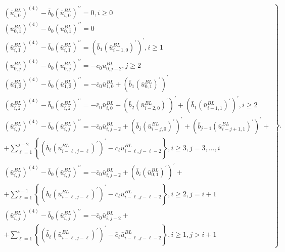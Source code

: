 \documentclass[10pt,a4paper]{amsart}
\begin{document}
\begin{equation}
\left. 
\begin{array}{c}
\left(\bar{u}^{BL}_{i,0}\right)^{(4)}-\bar{b}_{0}\left(\bar{u}^{BL}_{i,0}\right)^{\prime \prime }=0,i\geq 0 \\
\left(\bar{u}^{BL}_{0,1}\right)^{(4)}-\bar{b}_{0}\left(\bar{u}^{BL}_{0,1}\right)^{\prime \prime }=0 \\
\left(\bar{u}^{BL}_{i,1}\right)^{(4)}-\bar{b}_{0}\left(\bar{u}^{BL}_{i,1}\right)^{\prime \prime }=\left( \bar{b}_{1}\left(\bar{u}^{BL}_{i-1,0}\right)^{\prime }\right) ^{\prime },i\geq 1 \\
\left(\bar{u}^{BL}_{0,j}\right)^{(4)}-\bar{b}_{0}\left(\bar{u}^{BL}_{0,j}\right)^{\prime \prime }=-\bar{c}_{0}\bar{u}^{BL}_{0,j-2},j\geq 2 \\
\left(\bar{u}^{BL}_{1,2}\right)^{(4)}-\bar{b}_{0}\left(\bar{u}^{BL}_{1,2}\right)^{\prime \prime }=-\bar{c}_{0}\bar{u}^{BL}_{1,0}+\left( \bar{b}_{1}\left(\bar{u}^{BL}_{0,1}\right)^{\prime }\right) ^{\prime } \\
\left(\bar{u}^{BL}_{i,2}\right)^{(4)}-\bar{b}_{0}\left(\bar{u}^{BL}_{i,2}\right)^{\prime \prime }=-\bar{c}_{0}\bar{u}^{BL}_{i,0}+\left( \bar{b}_{2}\left(\bar{u}^{BL}_{i-2,0}\right)^{\prime }\right) ^{\prime }+\left( \bar{b}_{1}\left(\bar{u}^{BL}_{i-1,1}\right)^{\prime }\right) ^{\prime },i\geq 2 \\
\left(\bar{u}^{BL}_{i,j}\right)^{(4)}-\bar{b}_{0}\left(\bar{u}^{BL}_{i,j}\right)^{\prime \prime }=-\bar{c}_{0}\bar{u}^{BL}_{i,j-2}+\left( \bar{b}_{j}\left(\bar{u}^{BL}_{i-j,0}\right)^{\prime }\right) ^{\prime }+\left( \bar{b}_{j-1}\left(\bar{u}^{BL}_{i-j+1,1}\right)^{\prime }\right) ^{\prime }+ \\
+\sum_{\ell =1}^{j-2}\left\{ \left( \bar{b}_{\ell}\left(\bar{u}^{BL}_{i-\ell ,j-\ell}\right)^{\prime }\right) ^{\prime }-\bar{c}_{\ell}\bar{u}^{BL}_{i-\ell ,j-\ell -2}\right\} ,i\geq 3,j=3,\ldots ,i \\
\left(\bar{u}^{BL}_{i,j}\right)^{(4)}-\bar{b}_{0}\left(\bar{u}^{BL}_{i,j}\right)^{\prime \prime }=-\bar{c}_{0}\bar{u}^{BL}_{i,j-2}+\left( \bar{b}_{i}\left(\bar{u}^{BL}_{0,1}\right)^{\prime }\right) ^{\prime }+ \\
+\sum_{\ell =1}^{i-1}\left\{ \left( \bar{b}_{\ell}\left(\bar{u}^{BL}_{i-\ell ,j-\ell}\right)^{\prime }\right) ^{\prime }-\bar{c}_{\ell}\bar{u}^{BL}_{i-\ell ,j-\ell -2}\right\} ,i\geq 2,j=i+1 \\
\left(\bar{u}^{BL}_{i,j}\right)^{(4)}-\bar{b}_{0}\left(\bar{u}^{BL}_{i,j}\right)^{\prime \prime }=-\bar{c}_{0}\bar{u}^{BL}_{i,j-2}+ \\
+\sum_{\ell =1}^{i}\left\{ \left( \bar{b}_{\ell}\left(\bar{u}^{BL}_{i-\ell ,j-\ell}\right)^{\prime }\right) ^{\prime }-\bar{c}_{\ell}\bar{u}^{BL}_{i-\ell ,j-\ell -2}\right\} ,i\geq 1,j>i+1
\end{array}%
\right\}.  \label{ubar_ij}
\end{equation}
\end{document}
